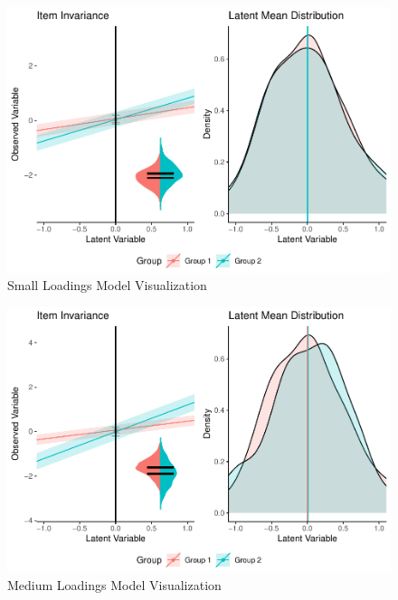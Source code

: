\documentclass[
  man]{apa7}
\begin{document}
\begin{figure}
\centering
\includegraphics{manuscript_files/figure-latex/small-load-pic-1.pdf}
\caption{\label{fig:small-load-pic}Small Loadings Model Visualization}
\end{figure}

\begin{figure}
\centering
\includegraphics{manuscript_files/figure-latex/med-load-pic-1.pdf}
\caption{\label{fig:med-load-pic}Medium Loadings Model Visualization}
\end{figure}
\end{document}
